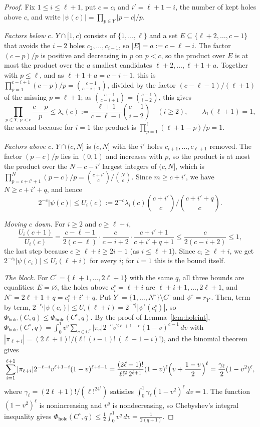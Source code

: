 \documentclass[11pt]{article}
\begin{document}
\begin{proof}
Fix $1\le i\le \ell+1$, put $c=c_i$ and $i'=\ell+1-i$, the number of kept holes
above $c$, and write $|\psi(c)|=\prod_{p\in Y}|p-c|/p$.

\emph{Factors below $c$.}  $Y\cap[1,c)$ consists of $\{1,\ldots,\ell\}$ and a
set $E\subseteq\{\ell+2,\ldots,c-1\}$ that avoids the $i-2$ holes
$c_2,\ldots,c_{i-1}$, so $|E|=a:=c-\ell-i$.  The factor $(c-p)/p$ is
positive and decreasing in $p$ on $p<c$, so the product over $E$ is at
most the product over the $a$ smallest candidates $\ell+2,\ldots,\ell+1+a$.
Together with $p\le\ell$, and as $\ell+1+a=c-i+1$, this is
$\prod_{p=1}^{c-i+1}(c-p)/p=\binom{c-1}{c-i+1}$, divided by the factor
$(c-\ell-1)/(\ell+1)$ of the missing $p=\ell+1$; as $\binom{c-1}{c-i+1}=\binom{c-1}{i-2}$, this gives
\[
  \prod_{p\in Y,\,p<c}\frac{c-p}p\le\lambda_i(c):=
  \frac{\ell+1}{c-\ell-1}\binom{c-1}{i-2}\quad(i\ge2),\qquad\lambda_1(\ell+1)=1,
\]
the second because for $i=1$ the product is
$\prod_{p=1}^{\ell}(\ell+1-p)/p=1$.

\emph{Factors above $c$.}  $Y\cap(c,N]$ is $(c,N]$ with the $i'$ holes
$c_{i+1},\ldots,c_{\ell+1}$ removed.  The factor $(p-c)/p$ lies in $(0,1)$ and
increases with $p$, so the product is at most the product over the
$N-c-i'$ largest integers of $(c,N]$, which is
$\prod_{p=c+i'+1}^{N}(p-c)/p=\binom{c+i'}c\big/\binom Nc$.  Since
$m\ge c+i'$, we have $N\ge c+i'+q$, and hence
\[
  2^{-c}|\psi(c)|\le U_i(c):=2^{-c}\lambda_i(c)
        \binom{c+i'}c\Big/\binom{c+i'+q}c .
\]

\emph{Moving $c$ down.}  For $i\ge2$ and $c\ge \ell+i$,
\[
  \frac{U_i(c+1)}{U_i(c)}
  =\frac{c-\ell-1}{2(c-\ell)}\cdot\frac c{c-i+2}\cdot\frac{c+i'+1}{c+i'+q+1}
  \le\frac c{2(c-i+2)}\le1,
\]
the last step because $c\ge \ell+i\ge2i-1$ (as $i\le \ell+1$).  Since
$c_i\ge \ell+i$, we get $2^{-c_i}|\psi(c_i)|\le U_i(\ell+i)$ for every $i$; for $i=1$
this is the bound itself.

\emph{The block.}  For $C^\circ=\{\ell+1,\ldots,2\ell+1\}$ with the same $q$, all
three bounds are equalities: $E=\varnothing$, the holes above
$c_i^\circ=\ell+i$ are $\ell+i+1,\ldots,2\ell+1$, and
$N^\circ=2\ell+1+q=c_i^\circ+i'+q$.
Put $Y^\circ=\{1,\ldots,N^\circ\}\setminus C^\circ$ and $\psi^\circ=r_{Y^\circ}$.
Then, term by term,
$2^{-c_i}|\psi(c_i)|\le U_i(\ell+i)=2^{-c_i^\circ}|\psi^\circ(c_i^\circ)|$, so
$\Phi_{\mathrm{hole}}(C,q)\le \Phi_{\mathrm{hole}}(C^\circ,q)$.  By the proof of Lemma~\ref{lem:holeint},
$\Phi_{\mathrm{hole}}(C^\circ,q)=\int_0^1v^q\sum_{c\in C^\circ}|\pi_c|2^{-c}v^{2\ell+1-c}(1-v)^{c-1}\,dv$
with $|\pi_{\ell+i}|=(2\ell+1)!/\bigl(\ell!\,(i-1)!\,(\ell+1-i)!\bigr)$, and the binomial
theorem gives
\[
  \sum_{i=1}^{\ell+1}|\pi_{\ell+i}|2^{-\ell-i}v^{\ell+1-i}(1-v)^{\ell+i-1}
  =\frac{(2\ell+1)!}{\ell!^2\,2^{\ell+1}}(1-v)^\ell\Bigl(v+\frac{1-v}2\Bigr)^\ell
  =\frac{\gamma_\ell}2(1-v^2)^\ell,
\]
where $\gamma_\ell=(2\ell+1)!/(\ell!^24^\ell)$ satisfies
$\int_0^1\gamma_\ell(1-v^2)^\ell\,dv=1$.  The function $(1-v^2)^\ell$ is
nonincreasing and $v^q$ is nondecreasing, so Chebyshev's integral inequality
gives $\Phi_{\mathrm{hole}}(C^\circ,q)\le\frac12\int_0^1v^q\,dv=\frac1{2(q+1)}$.
\end{proof}
\end{document}

